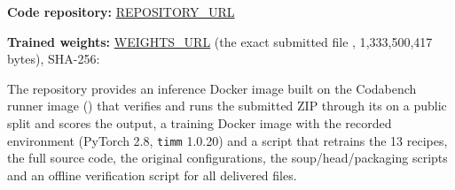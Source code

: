 \documentclass[a4paper, 10pt, conference]{ieeeconf}
\begin{document}
\textbf{Code repository:} \url{REPOSITORY_URL}

\textbf{Trained weights:} \url{WEIGHTS_URL} (the exact submitted file , 1{,}333{,}500{,}417 bytes), SHA-256:\par
\noindent{}

The repository provides an inference Docker image built on the Codabench runner image () that verifies and runs the submitted ZIP through its  on a public split and scores the output, a training Docker image with the recorded environment (PyTorch 2.8, \texttt{timm} 1.0.20) and a script that retrains the 13 recipes, the full source code, the original configurations, the soup/head/packaging scripts and an offline verification script for all delivered files.



\end{document}
